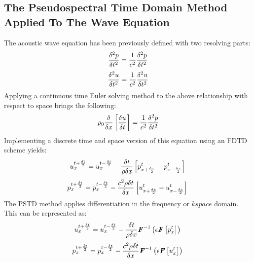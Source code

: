 \subsection{The Pseudospectral Time Domain Method Applied To The Wave Equation}

The acoustic wave equation has been previously defined with two resolving parts:\\
\begin{equation}
\frac{\delta^2 p}{\delta t^2} = \frac{1}{c^2} \frac{\delta^2 p}{\delta t^2}\\
\end{equation}
\begin{equation}
\frac{\delta^2 u}{\delta t^2} = \frac{1}{c^2} \frac{\delta^2 u}{\delta t^2}\\
\end{equation}
Applying a continuous time Euler solving method to the above relationship with respect to space brings the following:\\
\begin{equation}
\rho_0 \frac{\delta}{\delta x}\left[\frac{\delta u}{\delta t}\right] =\frac{1}{c^2} \frac{\delta ^2 p}{\delta t^2} \\
\end{equation}
Implementing a discrete time and space version of this equation using an FDTD scheme yields:\\
\begin{equation}
u^{t + \frac{\delta t}{2}}_{x} = u^{t - \frac{\delta t}{2}}_{x} - \frac{\delta t}{\rho \delta x} \left[p^{t}_{x + \frac{\delta x}{2}} - p^{t}_{x - \frac{\delta x}{2}}\right]\\
\end{equation}
\begin{equation}
p^{t + \frac{\delta t}{2}}_{x} = p^{t - \frac{\delta t}{2}}_{x} - \frac{c^2 \rho \delta t}{\delta x} \left[u^{t}_{x + \frac{\delta x}{2}} - u^{t}_{x - \frac{\delta x}{2}}\right]\\
\end{equation}
The PSTD method applies differentiation in the frequency or $ \textit{k} space$ domain. This can be represented as:\\
\begin{equation}
u^{t + \frac{\delta t}{2}}_{x} = u^{t - \frac{\delta t}{2}}_{x} - \frac{\delta t}{\rho \delta x} \textbf{\textit{F}}^{-1}\left(\epsilon \textbf{\textit{F}}\left[p^{t}_{x}\right] \right)\\
\end{equation}
\begin{equation}
p^{t + \frac{\delta t}{2}}_{x} = p^{t - \frac{\delta t}{2}}_{x} - \frac{c^2 \rho \delta t}{\delta x} \textbf{\textit{F}}^{-1}\left( \epsilon \textbf{\textit{F}} \left[ u^{t}_{x} \right] \right)\\
\end{equation}
